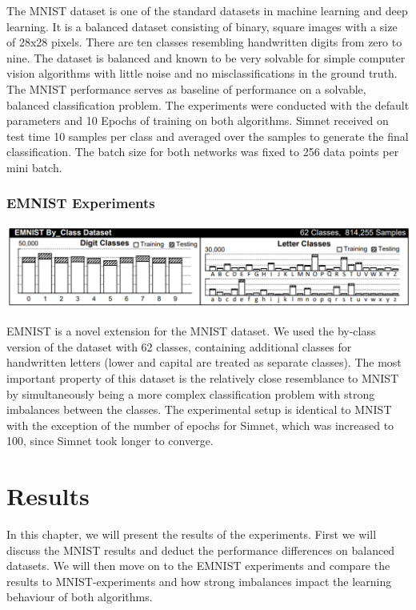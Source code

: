 ﻿\documentclass[a4paper,pt12]{article}
\begin{document}
The MNIST dataset is one of the standard datasets in machine learning and deep learning. It is a balanced dataset consisting of binary, square images with a size of 28x28 pixels. There are ten classes resembling handwritten digits from zero to nine. The dataset is balanced and known to be very solvable for simple computer vision algorithms with little noise and no misclassifications in the ground truth. \newline
The MNIST performance serves as baseline of performance on a solvable, balanced classification problem. \newline
The experiments were conducted with the default parameters and 10 Epochs of training on both algorithms. Simnet received on test time 10 samples per class and averaged over the samples to generate the final classification. The batch size for both networks was fixed to 256 data points per mini batch.

\subsubsection{EMNIST Experiments}

\includegraphics[scale=0.6]{emnist.png}

EMNIST is a novel extension for the MNIST dataset. We used the by-class version of the dataset with 62 classes, containing additional classes for handwritten letters (lower and capital are treated as separate classes). The most important property of this dataset is the relatively close resemblance to MNIST by simultaneously being a more complex classification problem with strong imbalances between the classes. \newline
The experimental setup is identical to MNIST with the exception of the number of epochs for Simnet, which was increased to 100, since Simnet took longer to converge.


\section{Results}
In this chapter, we will present the results of the experiments. First we will discuss the MNIST results and deduct the performance differences on balanced datasets. We will then move on to the EMNIST experiments and compare the results to MNIST-experiments and how strong imbalances impact the learning behaviour of both algorithms.
\end{document}
